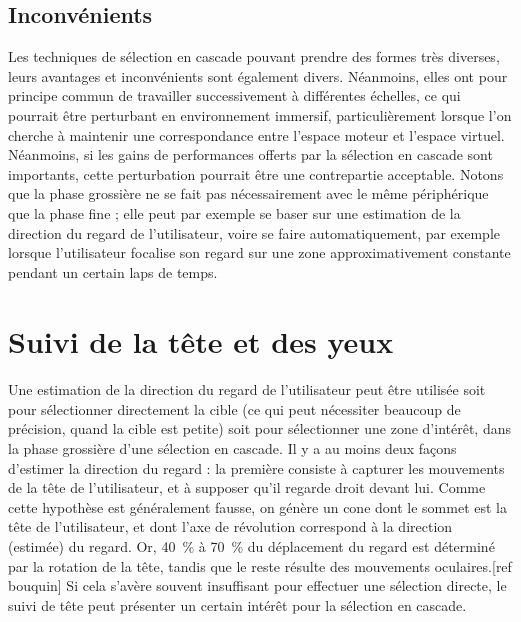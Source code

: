 	\subsection{Inconvénients}
	Les techniques de sélection en cascade pouvant prendre des formes très diverses, leurs avantages et inconvénients sont également divers. Néanmoins, elles ont pour principe commun de travailler successivement à différentes échelles, ce qui pourrait être perturbant en environnement immersif, particulièrement lorsque l'on cherche à maintenir une correspondance entre l'espace moteur et l'espace virtuel. Néanmoins, si les gains de performances offerts par la sélection en cascade sont importants, cette perturbation pourrait être une contrepartie acceptable. Notons que la phase grossière ne se fait pas nécessairement avec le même périphérique que la phase fine ; elle peut par exemple se baser sur une estimation de la direction du regard de l'utilisateur, voire se faire automatiquement, par exemple lorsque l'utilisateur focalise son regard sur une zone approximativement constante pendant un certain laps de temps.


\section{Suivi de la tête et des yeux}
	\paragraph{}
	Une estimation de la direction du regard de l'utilisateur peut être utilisée soit pour sélectionner directement la cible (ce qui peut nécessiter beaucoup de précision, quand la cible est petite) soit pour sélectionner une zone d'intérêt, dans la phase grossière d'une sélection en cascade. Il y a au moins deux façons d'estimer la direction du regard : la première consiste à capturer les mouvements de la tête de l'utilisateur, et à supposer qu'il regarde droit devant lui. Comme cette hypothèse est généralement fausse, on génère un cone dont le sommet est la tête de l'utilisateur, et dont l'axe de révolution correspond à la direction (estimée) du regard. Or, 40~\%{} à 70~\%{} du déplacement du regard est déterminé par la rotation de la tête, tandis que le reste résulte des mouvements oculaires.[ref bouquin] Si cela s'avère souvent insuffisant pour effectuer une sélection directe, le suivi de tête peut présenter un certain intérêt pour la sélection en cascade.
		
